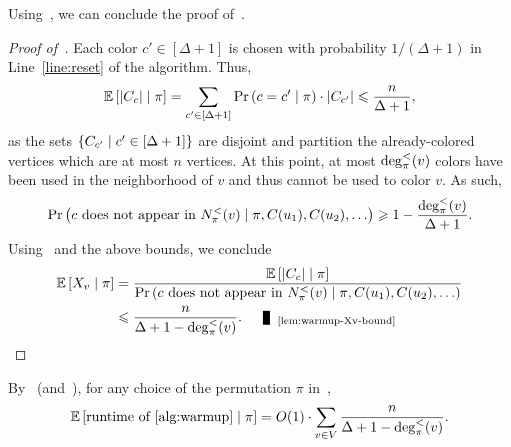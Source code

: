 Using~, we can conclude the proof of~. 
\begin{proof}[Proof of~]
	Each color $c' \in [\Delta+1]$ is chosen with probability $1/(\Delta+1)$ in Line~\eqref{line:reset} of the algorithm. Thus, 
	\[
	\operatorname*{{\mathbb{E}}}\left[\left\vert{C_c}\right\vert \mid \pi\right] = \sum_{c'\in [\Delta +1]}{\operatorname*{\textnormal{Pr}}\left(c=c' \mid \pi\right)\cdot \left\vert{C_{c'}}\right\vert } \leqslant \frac{n}{\Delta +1}, 
	\]
	as the sets $\left\{ C_{c'} \mid c' \in [\Delta+1] \right\}$ are disjoint and partition the already-colored vertices which are at most $n$ vertices. 
	At this point, at most $\deg^{<}_{\pi}(v)$ colors have been used in the neighborhood of $v$ and thus cannot be used to color $v$. As such,
	\[
	\operatorname*{\textnormal{Pr}}\left(\text{$c$ does not appear in $N^{<}_{\pi}(v)$} \mid \pi, C(u_1),C(u_2),\ldots\right) \geqslant 1-\frac{\deg^{<}_{\pi}(v)}{\Delta +1}.
	\]
	Using~ and the above bounds, we conclude
	\begin{align*}
		\expect{X_v \mid \pi } &= \frac{\expect{\card{C_c} \mid \pi}}{\Pr\paren{\text{$c$ does not appear in $\Nback{v}$} \mid \pi, C(u_1),C(u_2),\ldots}} \\
		&\leq \frac{n}{\Delta +1 -\degback{v}}.\Qed{lem:warmup-Xv-bound}
	\end{align*}
	
\end{proof}

By~ (and~), for any choice of the permutation $\pi$ in~,  
\begin{align}
	\expect{\text{runtime of~\Cref{alg:warmup}} \mid \pi} = O(1) \cdot \sum_{v \in V} \frac{n}{\Delta+1-\degback{v}}.  \label{eq:warmup-suffices}
\end{align}

